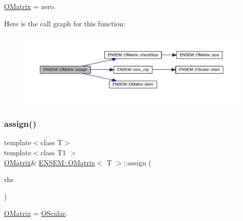 \mbox{\hyperlink{classENSEM_1_1OMatrix}{O\+Matrix}} = zero. 

Here is the call graph for this function\+:
\nopagebreak
\begin{figure}[H]
\begin{center}
\leavevmode
\includegraphics[width=350pt]{dd/d80/classENSEM_1_1OMatrix_a9b8826edfb36e1bc701a7778424cfe31_cgraph}
\end{center}
\end{figure}
\mbox{\label{classENSEM_1_1OMatrix_af0aaac940f907eb3db104e9f57b90a4f}} 
\subsubsection{\texorpdfstring{assign()}{assign()}\hspace{0.1cm}{\footnotesize\ttfamily [4/9]}}
{\footnotesize\ttfamily template$<$class T$>$ \\
template$<$class T1 $>$ \\
\mbox{\hyperlink{classENSEM_1_1OMatrix}{O\+Matrix}}\& \mbox{\hyperlink{classENSEM_1_1OMatrix}{E\+N\+S\+E\+M\+::\+O\+Matrix}}$<$ T $>$\+::assign (\begin{DoxyParamCaption}\item[{const \mbox{\hyperlink{classENSEM_1_1OScalar}{O\+Scalar}}$<$ T1 $>$ \&}]{rhs }\end{DoxyParamCaption})\hspace{0.3cm}{\ttfamily [inline]}}



\mbox{\hyperlink{classENSEM_1_1OMatrix}{O\+Matrix}} = \mbox{\hyperlink{classENSEM_1_1OScalar}{O\+Scalar}}. 

